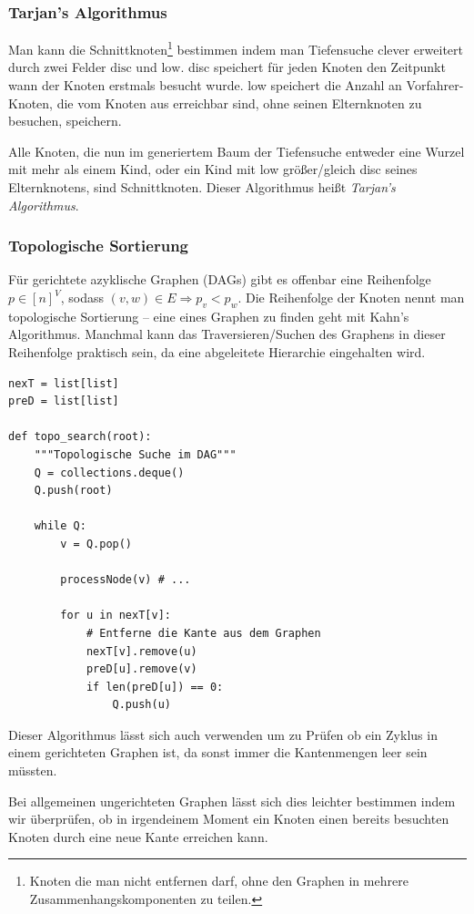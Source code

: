 \subsubsection{Tarjan's Algorithmus}
Man kann die Schnittknoten\footnote{Knoten die man nicht entfernen darf, ohne den Graphen in mehrere Zusammenhangskomponenten zu teilen.} bestimmen indem man Tiefensuche clever erweitert durch zwei Felder \(\text{disc}\) und \(\text{low}\).
disc speichert für jeden Knoten den Zeitpunkt wann der Knoten erstmals besucht wurde.
low speichert die Anzahl an Vorfahrer-Knoten, die vom Knoten aus erreichbar sind, ohne seinen Elternknoten zu besuchen, speichern.

Alle Knoten, die nun im generiertem Baum der Tiefensuche entweder eine Wurzel mit mehr als einem Kind, oder ein Kind mit low größer/gleich disc seines Elternknotens, sind Schnittknoten.
Dieser Algorithmus heißt \emph{Tarjan's Algorithmus}.

\subsubsection{Topologische Sortierung}
Für gerichtete azyklische Graphen (DAGs) gibt es offenbar eine Reihenfolge \(p \in [n]^V\), sodass \((v, w) \in E \Rightarrow p_v < p_w\).
Die Reihenfolge der Knoten nennt man topologische Sortierung -- eine eines Graphen zu finden geht mit Kahn's Algorithmus.
Manchmal kann das Traversieren/Suchen des Graphens in dieser Reihenfolge praktisch sein, da eine abgeleitete Hierarchie eingehalten wird.

\begin{lstlisting}
nexT = list[list]
preD = list[list]

def topo_search(root):
    """Topologische Suche im DAG"""
    Q = collections.deque()
    Q.push(root)

    while Q:
        v = Q.pop()

        processNode(v) # ...

        for u in nexT[v]:
            # Entferne die Kante aus dem Graphen
            nexT[v].remove(u)
            preD[u].remove(v)
            if len(preD[u]) == 0:
                Q.push(u)
\end{lstlisting}
Dieser Algorithmus lässt sich auch verwenden um zu Prüfen ob ein Zyklus in einem gerichteten Graphen ist, da sonst immer die Kantenmengen leer sein müssten.

Bei allgemeinen ungerichteten Graphen lässt sich dies leichter bestimmen indem wir überprüfen, ob in irgendeinem Moment ein Knoten einen bereits besuchten Knoten durch eine neue Kante erreichen kann.


